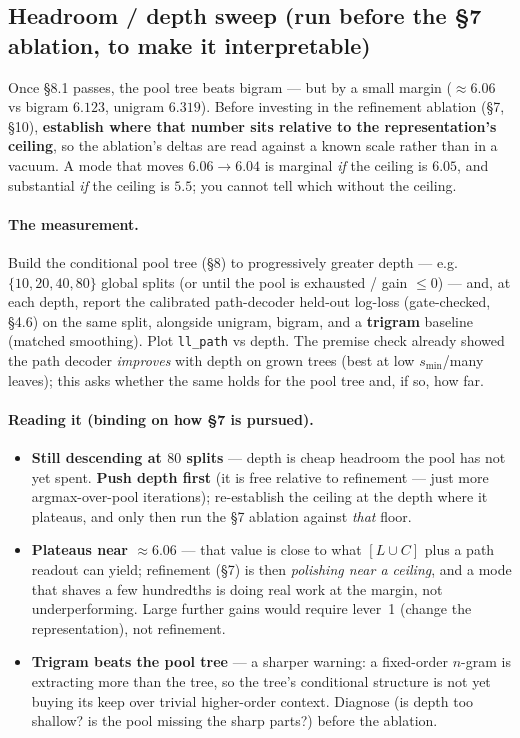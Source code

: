\documentclass[11pt]{article}
\newcommand{\code}[1]{\texttt{#1}}
\begin{document}
\subsection{Headroom / depth sweep (run before the \S7 ablation, to make it interpretable)}
Once \S8.1 passes, the pool tree beats bigram --- but by a small margin ($\approx6.06$ vs bigram $6.123$, unigram $6.319$). Before investing in the refinement ablation (\S7, \S10), \textbf{establish where that number sits relative to the representation's ceiling}, so the ablation's deltas are read against a known scale rather than in a vacuum. A mode that moves $6.06\to6.04$ is marginal \emph{if} the ceiling is $6.05$, and substantial \emph{if} the ceiling is $5.5$; you cannot tell which without the ceiling.

\paragraph{The measurement.} Build the conditional pool tree (\S8) to progressively greater depth --- e.g.\ $\{10, 20, 40, 80\}$ global splits (or until the pool is exhausted / gain $\le0$) --- and, at each depth, report the calibrated path-decoder held-out log-loss (gate-checked, \S4.6) on the same split, alongside unigram, bigram, and a \textbf{trigram} baseline (matched smoothing). Plot \code{ll\_path} vs depth. The premise check already showed the path decoder \emph{improves} with depth on grown trees (best at low $s_{\min}$/many leaves); this asks whether the same holds for the pool tree and, if so, how far.

\paragraph{Reading it (binding on how \S7 is pursued).}
\begin{itemize}[nosep]
\item \textbf{Still descending at $80$ splits} --- depth is cheap headroom the pool has not yet spent. \textbf{Push depth first} (it is free relative to refinement --- just more argmax-over-pool iterations); re-establish the ceiling at the depth where it plateaus, and only then run the \S7 ablation against \emph{that} floor.
\item \textbf{Plateaus near $\approx6.06$} --- that value is close to what $[L\cup C]$ plus a path readout can yield; refinement (\S7) is then \emph{polishing near a ceiling}, and a mode that shaves a few hundredths is doing real work at the margin, not underperforming. Large further gains would require lever~1 (change the representation), not refinement.
\item \textbf{Trigram beats the pool tree} --- a sharper warning: a fixed-order $n$-gram is extracting more than the tree, so the tree's conditional structure is not yet buying its keep over trivial higher-order context. Diagnose (is depth too shallow? is the pool missing the sharp parts?) before the ablation.
\end{itemize}
\end{document}
